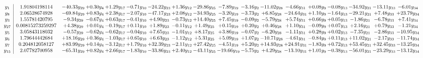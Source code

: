 \documentclass[9pt]{article}
\begin{document}
\[\begin{array}{c| c c@{\hskip 2pt} c@{\hskip 2pt} c@{\hskip 2pt} c@{\hskip 2pt} c@{\hskip 2pt} c@{\hskip 2pt} c@{\hskip 2pt} c@{\hskip 2pt} c@{\hskip 2pt} c@{\hskip 2pt} c@{\hskip 2pt} c@{\hskip 2pt} c@{\hskip 2pt} c@{\hskip 2pt} c@{\hskip 2pt} c@{\hskip 2pt} }
 y_{1}   &  1.91804198114 & -40.33 y_{29} & +  0.30 y_{4} & +  1.29 y_{17} & -0.71 y_{10} & -24.22 y_{23} & +  1.36 y_{12} & -29.86 y_{25} & -7.89 y_{19} & -3.16 y_{2} & -11.02 y_{28} & -4.66 y_{31} & +  0.08 y_{9} & -0.08 y_{13} & -34.92 y_{21} & -13.11 y_{33} & -6.01 y_{34}\\
 y_{8}   &  2.06528674928 & -69.84 y_{29} & +  0.83 y_{4} & +  2.38 y_{17} & -2.07 y_{10} & -47.17 y_{23} & +  2.08 y_{12} & -34.93 y_{25} & -3.20 y_{19} & -3.73 y_{2} & +  6.85 y_{28} & -24.64 y_{31} & +  1.10 y_{9} & -1.64 y_{13} & -29.21 y_{21} & +  7.48 y_{33} & + 23.79 y_{34}\\
 y_{3}   &  1.55781420795 & -9.34 y_{29} & -0.67 y_{4} & +  0.63 y_{17} & -0.41 y_{10} & +  4.90 y_{23} & -0.73 y_{12} & + 14.40 y_{25} & +  7.45 y_{19} & -0.09 y_{2} & -5.79 y_{28} & +  5.74 y_{31} & +  0.66 y_{9} & +  0.05 y_{13} & -1.86 y_{21} & -6.78 y_{33} & +  7.41 y_{34}\\
 y_{27}   &  0.00815273259297 & +  4.38 y_{29} & +  0.01 y_{4} & -0.19 y_{17} & +  0.11 y_{10} & +  1.89 y_{23} & -0.11 y_{12} & +  1.49 y_{25} & +  0.15 y_{19} & +  0.20 y_{2} & +  0.46 y_{28} & +  1.10 y_{31} & -0.09 y_{9} & +  0.07 y_{13} & +  2.16 y_{21} & +  0.79 y_{33} & -1.21 y_{34}\\
 y_{5}   &  3.05843118032 & -0.57 y_{29} & -0.62 y_{4} & -0.62 y_{17} & -0.04 y_{10} & +  7.65 y_{23} & -1.01 y_{12} & +  8.17 y_{25} & +  3.86 y_{19} & -0.07 y_{2} & -6.20 y_{28} & -1.11 y_{31} & +  0.28 y_{9} & +  0.02 y_{13} & -7.35 y_{21} & -2.86 y_{33} & -10.95 y_{34}\\
 y_{6}   &  1.79644442684 & + 18.16 y_{29} & +  0.36 y_{4} & -1.03 y_{17} & +  0.65 y_{10} & +  6.63 y_{23} & -1.12 y_{12} & +  5.31 y_{25} & +  5.09 y_{19} & +  1.07 y_{2} & -10.71 y_{28} & -4.61 y_{31} & -0.84 y_{9} & +  0.11 y_{13} & + 11.02 y_{21} & -2.17 y_{33} & -11.74 y_{34}\\
 y_{7}   &  0.204812058127 & + 83.99 y_{29} & +  0.14 y_{4} & -3.12 y_{17} & +  1.79 y_{10} & + 32.39 y_{23} & -2.11 y_{12} & + 27.42 y_{25} & -4.51 y_{19} & +  5.20 y_{2} & + 14.93 y_{28} & + 24.91 y_{31} & -1.83 y_{9} & +  0.72 y_{13} & + 53.45 y_{21} & + 32.45 y_{33} & -13.25 y_{34}\\
 y_{15}   &  2.07782700958 & -65.31 y_{29} & +  0.82 y_{4} & +  2.66 y_{17} & -1.83 y_{10} & -33.86 y_{23} & +  2.40 y_{12} & -43.11 y_{25} & -19.66 y_{19} & -5.75 y_{2} & +  4.29 y_{28} & -13.10 y_{31} & +  1.01 y_{9} & -0.38 y_{13} & -56.01 y_{21} & -23.29 y_{33} & -13.12 y_{34}\\

\end{array}\]
\end{document}
